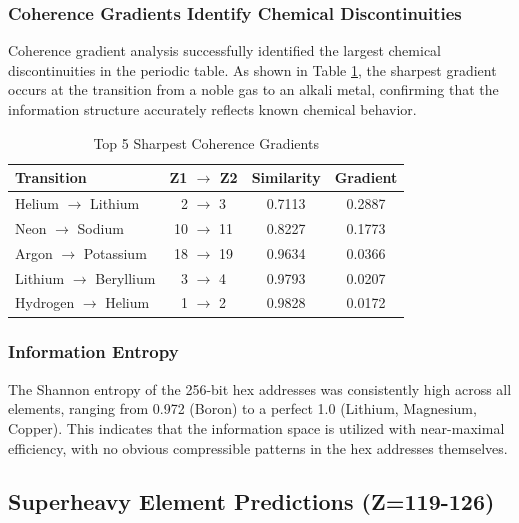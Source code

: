 \documentclass[12pt, a4paper]{article}
\begin{document}
\subsubsection{Coherence Gradients Identify Chemical Discontinuities}

Coherence gradient analysis successfully identified the largest chemical discontinuities in the periodic table. As shown in Table \ref{tab:gradients}, the sharpest gradient occurs at the transition from a noble gas to an alkali metal, confirming that the information structure accurately reflects known chemical behavior.

\begin{table}[h!]
    \centering
    \captionsetup{justification=centering}
    \caption{Top 5 Sharpest Coherence Gradients}
    \label{tab:gradients}
    \begin{tabular}{lccc}
        \toprule
        \textbf{Transition} & \textbf{Z1 $\rightarrow$ Z2} & \textbf{Similarity} & \textbf{Gradient} \\
        \midrule
        Helium $\rightarrow$ Lithium & 2 $\rightarrow$ 3 & 0.7113 & 0.2887 \\
        Neon $\rightarrow$ Sodium & 10 $\rightarrow$ 11 & 0.8227 & 0.1773 \\
        Argon $\rightarrow$ Potassium & 18 $\rightarrow$ 19 & 0.9634 & 0.0366 \\
        Lithium $\rightarrow$ Beryllium & 3 $\rightarrow$ 4 & 0.9793 & 0.0207 \\
        Hydrogen $\rightarrow$ Helium & 1 $\rightarrow$ 2 & 0.9828 & 0.0172 \\
        \bottomrule
    \end{tabular}
\end{table}

\subsubsection{Information Entropy}

The Shannon entropy of the 256-bit hex addresses was consistently high across all elements, ranging from 0.972 (Boron) to a perfect 1.0 (Lithium, Magnesium, Copper). This indicates that the information space is utilized with near-maximal efficiency, with no obvious compressible patterns in the hex addresses themselves.

\subsection{Superheavy Element Predictions (Z=119-126)}
\end{document}
